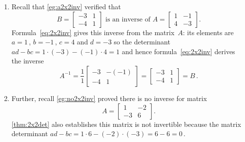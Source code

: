 \begin{example} \label{eg:}
\begin{enumerate}
\item Recall that \autoref{eg:a2x2inv} verified that
\begin{equation*}
B=\begin{bmatrix} -3&1\\-4&1 \end{bmatrix}
\text{ is an inverse of }
A=\begin{bmatrix} 1&-1\\4&-3 \end{bmatrix}.
\end{equation*}
Formula~\eqref{eq:2x2inv} gives this inverse from the matrix~\(A\): its elements are \(a=1\)\,, \(b=-1\)\,, \(c=4\) and \(d=-3\) so the determinant \(ad-bc=1\cdot(-3)-(-1)\cdot4=1\) and hence formula~\eqref{eq:2x2inv} derives the inverse
\begin{equation*}
A^{-1}=\frac11\begin{bmatrix} -3&-(-1)\\-4&1 \end{bmatrix}
=\begin{bmatrix} -3&1\\-4&1 \end{bmatrix}=B\,.
\end{equation*}

\item Further, recall \autoref{eg:no2x2inv} proved there is no inverse for matrix
\begin{equation*}
A=\begin{bmatrix} 1&-2\\-3&6 \end{bmatrix}.
\end{equation*}
\autoref{thm:2x2det} also establishes this matrix is not invertible because the matrix determinant \(ad-bc=1\cdot6-(-2)\cdot(-3)=6-6=0\)\,. 
\end{enumerate}
\end{example}




